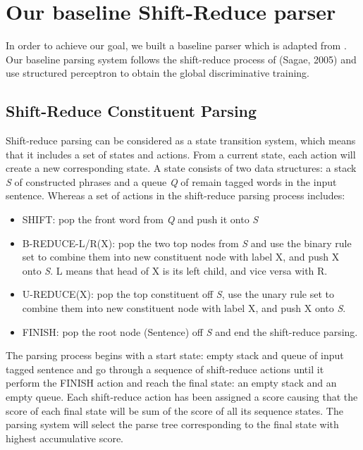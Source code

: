 \section {Our baseline Shift-Reduce parser} 
In order to achieve our goal, we built a baseline parser which is adapted from \cite{ref:2012Zhu}. Our baseline parsing system follows the shift-reduce process of (Sagae, 2005) and use structured perceptron to obtain the global discriminative training.
\subsection{Shift-Reduce Constituent Parsing}
Shift-reduce parsing can be considered as a state transition system, which means that it includes a set of states and actions. From a current state, each action will create a new corresponding state. A state consists of two data structures: a stack \textit{S} of constructed phrases and a queue \textit{Q} of remain tagged words in the input sentence. Whereas a set of actions in the shift-reduce parsing process includes:
\begin{itemize}
	\item SHIFT: pop the front word from \textit{Q} and push it onto \textit{S}
	\item B-REDUCE-L/R(X): pop the two top nodes from \textit{S} and use the binary rule set to combine them into new constituent node with label X, and push X onto \textit{S}. L means that head of X is its left child, and vice versa with R.
	\item U-REDUCE(X): pop the top constituent off \textit{S}, use the unary rule set to combine them into new constituent node with label X, and push X onto \textit{S}.
	\item FINISH: pop the root node (Sentence) off \textit{S} and end the shift-reduce parsing.
\end{itemize}

The parsing process begins with a start state: empty stack and queue of input tagged sentence and go through a sequence of shift-reduce actions until it perform the FINISH action and reach the final state: an empty stack and an empty queue. Each shift-reduce action has been assigned a score causing that the score of each final state will be sum of the score of all its sequence states. The parsing system will select the parse tree corresponding to the final state with highest accumulative score.

